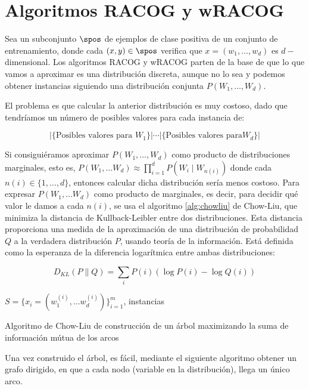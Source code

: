 \section{Algoritmos RACOG y wRACOG}
Sea un subconjunto $\spos$ de ejemplos de clase positiva de un conjunto de entrenamiento, donde cada $(x,y)\in \spos$ 
verifica que $x = (w_1, \ldots, w_d)$ es $d-$dimensional. Los algoritmos RACOG y wRACOG parten de la base de que lo que vamos
a aproximar es una distribución discreta, aunque no lo sea y podemos obtener instancias siguiendo una distribución 
conjunta $P(W_1, \ldots, W_d)$.

El problema es que calcular la anterior distribución es muy costoso, dado que tendríamos un número de posibles valores para 
cada instancia de:

\[|\{\textrm{Posibles valores para }W_1\}| \cdots |\{\textrm{Posibles valores para} W_d\}|\]

Si consiguiéramos aproximar $P(W_1, \ldots, W_d)$ como producto de distribuciones marginales, esto es, 
$P(W_1, \ldots W_d) \approx \prod_{i=1}^d P(W_i \mid W_{n(i)})$ donde cada $n(i) \in \{1, \ldots, d\}$,
entonces calcular dicha distribución sería menos costoso. Para expresar $P(W_1, \ldots W_d)$ como producto de marginales,
es decir, para decidir qué valor le damos a cada $n(i)$, se usa el algoritmo \ref{alg:chowliu} de Chow-Liu,
que minimiza la distancia de Kullback-Leibler entre dos distribuciones. Esta distancia proporciona una medida de la 
aproximación de una distribución de probabilidad $Q$ a la verdadera distribución $P$, usando teoría de la información. 
Está definida como la esperanza de la diferencia logarítmica entre ambas distribuciones:

\[D_{KL}(P \parallel Q) = \sum_{i} P(i) \left(\log P(i) - \log Q(i)\right)\]

\begin{algorithm}[H]
\begin{algorithmic}[1]
 \REQUIRE $S = \{x_i=(w_1^{(i)}, \ldots w_d^{(i)})\}_{i=1}^m$, instancias
 \ENDFOR
\end{algorithmic}
\caption{Algoritmo de Chow-Liu de construcción de un árbol maximizando la suma de información
mútua de los arcos}
\label{alg:chowliu}
\end{algorithm}

Una vez construido el árbol, es fácil, mediante el siguiente algoritmo obtener un grafo dirigido, en que a
cada nodo (variable en la distribución), llega un único arco.

